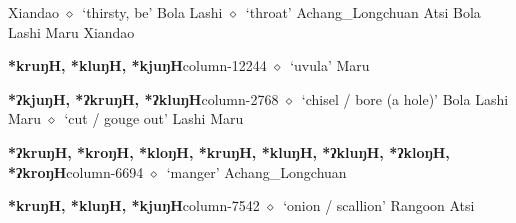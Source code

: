          Xiandao 
\hspace{1ex}
         $\diamond$~`thirsty, be'
         Bola 
\hspace{1ex}
         Lashi 
\hspace{1ex}
         $\diamond$~`throat'
         Achang\_Longchuan 
\hspace{1ex}
         Atsi 
\hspace{1ex}
         Bola 
\hspace{1ex}
         Lashi 
\hspace{1ex}
         Maru 
\hspace{1ex}
         Xiandao 
  \item {\footnotesize \textbf{*kruŋH, *kluŋH, *kjuŋH}}{\tiny column-12244}
         $\diamond$~`uvula'
         Maru 
  \item {\footnotesize \textbf{*ʔkjuŋH, *ʔkruŋH, *ʔkluŋH}}{\tiny column-2768}
         $\diamond$~`chisel / bore (a hole)'
         Bola 
\hspace{1ex}
         Lashi 
\hspace{1ex}
         Maru 
\hspace{1ex}
         $\diamond$~`cut / gouge out'
         Lashi 
\hspace{1ex}
         Maru 
  \item {\footnotesize \textbf{*ʔkruŋH, *kroŋH, *kloŋH, *kruŋH, *kluŋH, *ʔkluŋH, *ʔkloŋH, *ʔkroŋH}}{\tiny column-6694}
         $\diamond$~`manger'
         Achang\_Longchuan 
  \item {\footnotesize \textbf{*kruŋH, *kluŋH, *kjuŋH}}{\tiny column-7542}
         $\diamond$~`onion / scallion'
         Rangoon 
\hspace{1ex}
         Atsi 
\hspace{1ex}
